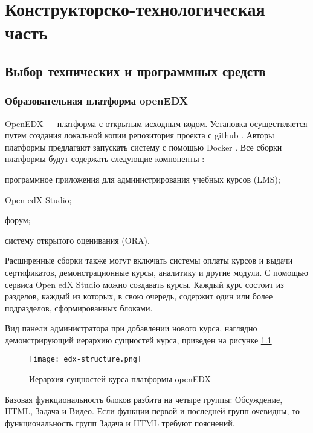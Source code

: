 \chapter{Конструкторско-технологическая часть}

\section{Выбор технических и программных средств}
\subsection{Образовательная платформа openEDX}
OpenEDX — платформа с открытым исходным кодом. Установка осуществляется путем создания локальной копии репозитория проекта с github \cite{edx-github}. Авторы платформы предлагают запускать систему с помощью Docker \cite{docker}. Все сборки платформы будут содержать следующие компоненты \cite{edx-install}:
\begin{itemize*}
	\item программное приложения для администрирования учебных курсов (LMS);
	\item Open edX Studio;
	\item форум;
	\item систему открытого оценивания (ORA).
\end{itemize*}

Расширенные сборки также могут включать системы оплаты курсов и выдачи сертификатов, демонстрационные курсы, аналитику и другие модули. С помощью сервиса Open edX Studio можно создавать курсы. Каждый курс состоит из разделов, каждый из которых, в свою очередь, содержит один или более подразделов, сформированных блоками. 

Вид панели администратора при добавлении нового курса, наглядно демонстрирующий иерархию сущностей курса, приведен на рисунке \ref{fig:edx-structure}

\begin{figure}[htbp]
	\centering
	\texttt{[image: edx-structure.png]}
	\caption{Иерархия сущностей курса платформы openEDX}%
	\label{fig:edx-structure}
\end{figure}

Базовая функциональность блоков разбита на четыре группы: Обсуждение, HTML, Задача и Видео. Если функции первой и последней групп очевидны, то функциональность групп Задача и HTML требуют пояснений.

